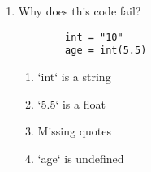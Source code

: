 \documentclass{article}
\begin{document}
\begin{enumerate}
        \item Why does this code fail?
        \begin{lstlisting}
        int = "10"
        age = int(5.5)
        \end{lstlisting}
        \begin{enumerate}[label=(\Alph*)]
            \item `int` is a string
            \item `5.5` is a float
            \item Missing quotes
            \item `age` is undefined
        \end{enumerate}

    \end{enumerate}
\end{document}
